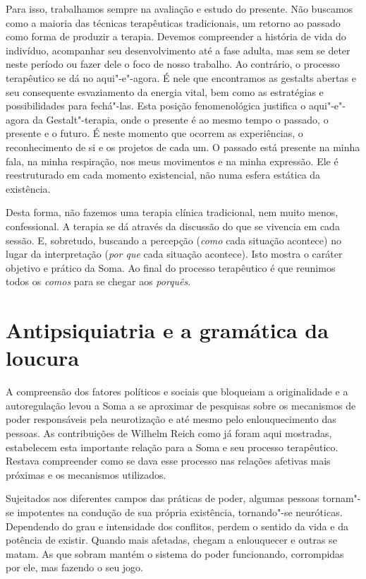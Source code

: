 Para isso, trabalhamos sempre na avaliação e estudo do presente. Não
buscamos como a maioria das técnicas terapêuticas tradicionais, um
retorno ao passado como forma de produzir a terapia. Devemos compreender
a história de vida do indivíduo, acompanhar seu desenvolvimento até a
fase adulta, mas sem se deter neste período ou fazer dele o foco de
nosso trabalho. Ao contrário, o processo terapêutico se dá no
aqui"-e"-agora. É nele que encontramos as gestalts abertas e seu
consequente esvaziamento da energia vital, bem como as estratégias e
possibilidades para fechá"-las. Esta posição fenomenológica justifica o
aqui"-e"-agora da Gestalt"-terapia, onde o presente é ao mesmo tempo o
passado, o presente e o futuro. É neste momento que ocorrem as
experiências, o reconhecimento de si e os projetos de cada um. O passado
está presente na minha fala, na minha respiração, nos meus movimentos e
na minha expressão. Ele é reestruturado em cada momento existencial, não
numa esfera estática da existência.

Desta forma, não fazemos uma terapia clínica tradicional, nem muito
menos, confessional. A terapia se dá através da discussão do que se
vivencia em cada sessão. E, sobretudo, buscando a percepção (\emph{como}
cada situação acontece) no lugar da interpretação (\emph{por que} cada
situação acontece). Isto mostra o caráter objetivo e prático da Soma. Ao
final do processo terapêutico é que reunimos todos os \emph{comos} para
se chegar aos \emph{porquês}.

\section{Antipsiquiatria e a gramática da loucura}

A compreensão dos fatores políticos e sociais que bloqueiam a
originalidade e a autoregulação levou a Soma a se aproximar de pesquisas
sobre os mecanismos de poder responsáveis pela neurotização e até mesmo
pelo enlouquecimento das pessoas. As contribuições de Wilhelm Reich como
já foram aqui mostradas, estabelecem esta importante relação para a Soma
e seu processo terapêutico. Restava compreender como se dava esse
processo nas relações afetivas mais próximas e os mecanismos utilizados.

Sujeitados aos diferentes campos das práticas de poder, algumas pessoas
tornam"-se impotentes na condução de sua própria existência, tornando"-se
neuróticas. Dependendo do grau e intensidade dos conflitos, perdem o
sentido da vida e da potência de existir. Quando mais afetadas, chegam a
enlouquecer e outras se matam. As que sobram mantém o sistema do poder
funcionando, corrompidas por ele, mas fazendo o seu jogo.

